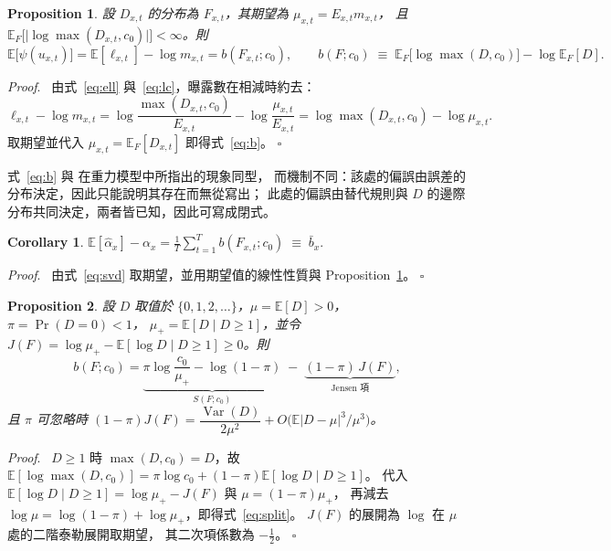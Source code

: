\documentclass[UTF8, fontset=macnew, a4paper, 12pt]{ctexart}
\newtheorem{prop}{Proposition}
\newtheorem{cor}{Corollary}
\newenvironment{proof}{\par\noindent\textit{Proof}.\ }{\hfill$\square$\par\vspace{4pt}}
\newcommand{\Ex}{\mathbb{E}}
\begin{document}
\begin{prop}\label{prop:fisher}
設 $D_{x,t}$ 的分布為 $F_{x,t}$，其期望為 $\mu_{x,t}=E_{x,t}m_{x,t}$，
且 $\Ex_{F}\bigl[\lvert\log\max(D_{x,t},c_0)\rvert\bigr]<\infty$。則
\begin{equation}\label{eq:b}
\Ex\big[\psi(u_{x,t})\big]=\Ex[\ell_{x,t}]-\log m_{x,t}=b(F_{x,t};c_0),
\qquad
b(F;c_0)\;\equiv\;\Ex_{F}\big[\log\max(D,c_0)\big]-\log\Ex_{F}[D] .
\end{equation}
\end{prop}

\begin{proof}
由式~\eqref{eq:ell} 與~\eqref{eq:lc}，曝露數在相減時約去：
\begin{equation}\label{eq:pf1}
\ell_{x,t}-\log m_{x,t}
=\log\frac{\max(D_{x,t},c_0)}{E_{x,t}}-\log\frac{\mu_{x,t}}{E_{x,t}}
=\log\max(D_{x,t},c_0)-\log\mu_{x,t} .
\end{equation}
取期望並代入 $\mu_{x,t}=\Ex_{F}[D_{x,t}]$ 即得式~\eqref{eq:b}。
\end{proof}

式~\eqref{eq:b} 與 \citet{santossilva2006} 在重力模型中所指出的現象同型，
而機制不同：該處的偏誤由誤差的分布決定，因此只能說明其存在而無從寫出；
此處的偏誤由替代規則與 $D$ 的邊際分布共同決定，兩者皆已知，因此可寫成閉式。

\begin{cor}\label{cor:alpha}
$\displaystyle \Ex[\hat\alpha_x]-\alpha_x
=\frac{1}{T}\sum_{t=1}^{T} b(F_{x,t};c_0)\;\equiv\;\bar b_x .$
\end{cor}

\begin{proof}
由式~\eqref{eq:svd} 取期望，並用期望值的線性性質與 Proposition~\ref{prop:fisher}。
\end{proof}

\begin{prop}\label{prop:split}
設 $D$ 取值於 $\{0,1,2,\dots\}$，$\mu=\Ex[D]>0$，$\pi=\Pr(D=0)<1$，
$\mu_{+}=\Ex[D\mid D\ge1]$，並令
$J(F)=\log\mu_{+}-\Ex[\log D\mid D\ge1]\ge0$。則
\begin{equation}\label{eq:split}
b(F;c_0)=
\underbrace{\pi\log\frac{c_0}{\mu_{+}}-\log(1-\pi)}_{S(F;c_0)}
\;-\;\underbrace{(1-\pi)\,J(F)}_{\text{Jensen 項}} ,
\end{equation}
且 $\pi$ 可忽略時
$(1-\pi)J(F)=\dfrac{\operatorname{Var}(D)}{2\mu^{2}}
+O\bigl(\Ex|D-\mu|^{3}/\mu^{3}\bigr)$。
\end{prop}

\begin{proof}
$D\ge1$ 時 $\max(D,c_0)=D$，故
$\Ex[\log\max(D,c_0)]=\pi\log c_0+(1-\pi)\Ex[\log D\mid D\ge1]$。
代入 $\Ex[\log D\mid D\ge1]=\log\mu_{+}-J(F)$ 與 $\mu=(1-\pi)\mu_{+}$，
再減去 $\log\mu=\log(1-\pi)+\log\mu_{+}$，即得式~\eqref{eq:split}。
$J(F)$ 的展開為 $\log$ 在 $\mu$ 處的二階泰勒展開取期望，
其二次項係數為 $-\tfrac12$。
\end{proof}
\end{document}
